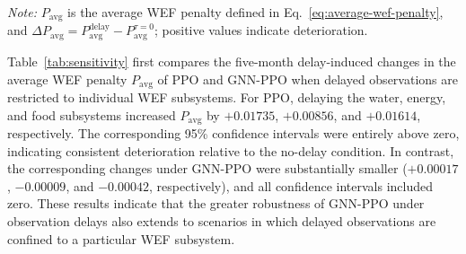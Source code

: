 \documentclass [a4paper,fleqn] {cas-dc}
\begin{document}
\begin{table}[t]
\centering
\caption{Five-month sensitivity of PPO and GNN-PPO.}
\label{tab:sensitivity}

\begin{flushleft}
\footnotesize
\textit{Note:} $P_{\mathrm{avg}}$ is the average WEF penalty defined in Eq.~\eqref{eq:average-wef-penalty}, and $\Delta P_{\mathrm{avg}}=P_{\mathrm{avg}}^{\mathrm{delay}}-P_{\mathrm{avg}}^{\tau=0}$; positive values indicate deterioration.
\end{flushleft}
\end{table}

Table~\ref{tab:sensitivity} first compares the five-month delay-induced changes in the average WEF penalty $P_{\mathrm{avg}}$ of PPO and GNN-PPO when delayed observations are restricted to individual WEF subsystems. For PPO, delaying the water, energy, and food subsystems increased $P_{\mathrm{avg}}$ by $+0.01735$, $+0.00856$, and $+0.01614$, respectively. The corresponding 95\% confidence intervals were entirely above zero, indicating consistent deterioration relative to the no-delay condition. In contrast, the corresponding changes under GNN-PPO were substantially smaller ($+0.00017$, $-0.00009$, and $-0.00042$, respectively), and all confidence intervals included zero. These results indicate that the greater robustness of GNN-PPO under observation delays also extends to scenarios in which delayed observations are confined to a particular WEF subsystem.
\end{document}

